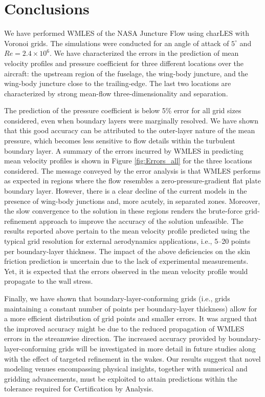 \documentclass{ctr}
\begin{document}
\section{Conclusions}\label{sec:conclusions}

We have performed WMLES of the NASA Juncture Flow using charLES with
Voronoi grids. The simulations were conducted for an angle of attack
of $5^\circ$ and $Re=2.4 \times 10^6$. We have characterized the
errors in the prediction of mean velocity profiles and pressure
coefficient for three different locations over the aircraft: the
upstream region of the fuselage, the wing-body juncture, and the
wing-body juncture close to the trailing-edge. The last two locations
are characterized by strong mean-flow three-dimensionality and
separation.

The prediction of the pressure coefficient is below 5\% error for all
grid sizes considered, even when boundary layers were marginally
resolved.  We have shown that this good accuracy can be attributed to
the outer-layer nature of the mean pressure, which becomes less
sensitive to flow details within the turbulent boundary layer. A
summary of the errors incurred by WMLES in predicting mean velocity
profiles is shown in Figure \ref{fig:Errors_all} for the three
locations considered.  The message conveyed by the error analysis is
that WMLES performs as expected in regions where the flow resembles a
zero-pressure-gradient flat plate boundary layer. However, there is a
clear decline of the current models in the presence of wing-body
junctions and, more acutely, in separated zones. Moreover, the slow
convergence to the solution in these regions renders the brute-force
grid-refinement approach to improve the accuracy of the solution
unfeasible. The results reported above pertain to the mean velocity
profile predicted using the typical grid resolution for external
aerodynamics applications, i.e., 5--20 points per boundary-layer
thickness. The impact of the above deficiencies on the skin friction
prediction is uncertain due to the lack of experimental
measurements. Yet, it is expected that the errors observed in the mean
velocity profile would propagate to the wall stress.

Finally, we have shown that boundary-layer-conforming grids (i.e.,
grids maintaining a constant number of points per boundary-layer
thickness) allow for a more efficient distribution of grid points and
smaller errors. It was argued that the improved accuracy might be due
to the reduced propagation of WMLES errors in the streamwise
direction.  The increased accuracy provided by
boundary-layer-conforming grids will be investigated in more detail in
future studies along with the effect of targeted refinement in the
wakes. Our results suggest that novel modeling venues encompassing
physical insights, together with numerical and gridding advancements,
must be exploited to attain predictions within the tolerance required
for Certification by Analysis.
\end{document}
